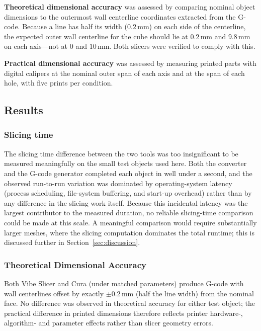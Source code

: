 \documentclass[10pt,twocolumn,a4paper]{article}
\begin{document}
\textbf{Theoretical dimensional accuracy} was assessed by comparing
nominal object dimensions to the outermost wall centerline coordinates
extracted from the G-code.
Because a line has half its width ($0.2$\,mm) on each side of
the centerline, the expected outer wall centerline for the cube
should lie at $0.2$\,mm and $9.8$\,mm on each axis—not at $0$
and $10$\,mm. Both slicers were verified to comply with this.

\textbf{Practical dimensional accuracy} was assessed by measuring
printed parts with digital calipers at the nominal outer
span of each axis and at the span of each hole, with five prints
per condition.

\subsection{Results}

\subsubsection*{Slicing time}

The slicing time difference between the two tools was too
insignificant to be measured meaningfully on the small test
objects used here. Both the converter and the G-code generator
completed each object in well under a second, and the observed
run-to-run variation was dominated by operating-system latency
(process scheduling, file-system buffering, and start-up overhead)
rather than by any difference in the slicing work itself. Because
this incidental latency was the largest contributor to the measured
duration, no reliable slicing-time comparison could be made at this
scale. A meaningful comparison would require substantially larger
meshes, where the slicing computation dominates the total runtime;
this is discussed further in Section~\ref{sec:discussion}.

\subsubsection*{Theoretical Dimensional Accuracy}

Both Vibe Slicer and Cura (under matched parameters) produce
G-code with wall centerlines offset by exactly $\pm$0.2\,mm
(half the line width) from the nominal face.
No difference was observed in theoretical accuracy for either test
object; the practical difference in printed dimensions therefore
reflects printer hardware-, algorithm- and parameter effects rather than slicer geometry errors.
\end{document}
